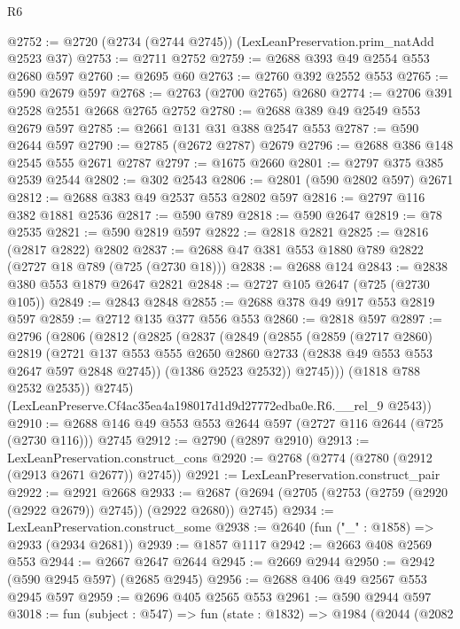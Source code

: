 \begin{lexlean}{R6}
\begin{coremodule}
@2752 := @2720 (@2734 (@2744 @2745)) (LexLeanPreservation.prim_natAdd @2523 @37)
@2753 := @2711 @2752
@2759 := @2688 @393 @49 @2554 @553 @2680 @597
@2760 := @2695 @60
@2763 := @2760 @392 @2552 @553
@2765 := @590 @2679 @597
@2768 := @2763 (@2700 @2765) @2680
@2774 := @2706 @391 @2528 @2551 @2668 @2765 @2752
@2780 := @2688 @389 @49 @2549 @553 @2679 @597
@2785 := @2661 @131 @31 @388 @2547 @553
@2787 := @590 @2644 @597
@2790 := @2785 (@2672 @2787) @2679
@2796 := @2688 @386 @148 @2545 @555 @2671 @2787
@2797 := @1675 @2660
@2801 := @2797 @375 @385 @2539 @2544
@2802 := @302 @2543
@2806 := @2801 (@590 @2802 @597) @2671
@2812 := @2688 @383 @49 @2537 @553 @2802 @597
@2816 := @2797 @116 @382 @1881 @2536
@2817 := @590 @789
@2818 := @590 @2647
@2819 := @78 @2535
@2821 := @590 @2819 @597
@2822 := @2818 @2821
@2825 := @2816 (@2817 @2822) @2802
@2837 := @2688 @47 @381 @553 @1880 @789 @2822 (@2727 @18 @789 (@725 (@2730 @18)))
@2838 := @2688 @124
@2843 := @2838 @380 @553 @1879 @2647 @2821
@2848 := @2727 @105 @2647 (@725 (@2730 @105))
@2849 := @2843 @2848
@2855 := @2688 @378 @49 @917 @553 @2819 @597
@2859 := @2712 @135 @377 @556 @553
@2860 := @2818 @597
@2897 := @2796
    (@2806
      (@2812
        (@2825
          (@2837
            (@2849
              (@2855
                (@2859
                  (@2717 @2860)
                  @2819
                  (@2721
                    @137
                    @553
                    @555
                    @2650
                    @2860
                    @2733
                    (@2838 @49 @553 @553 @2647 @597 @2848 @2745))
                  (@1386 @2523 @2532))
                @2745)))
          (@1818 @788 @2532 @2535))
        @2745)
      (LexLeanPreserve.Cf4ac35ea4a198017d1d9d27772edba0e.R6.__rel_9 @2543))
@2910 := @2688 @146 @49 @553 @553 @2644 @597 (@2727 @116 @2644 (@725 (@2730 @116))) @2745
@2912 := @2790 (@2897 @2910)
@2913 := LexLeanPreservation.construct_cons
@2920 := @2768 (@2774 (@2780 (@2912 (@2913 @2671 @2677)) @2745))
@2921 := LexLeanPreservation.construct_pair
@2922 := @2921 @2668
@2933 := @2687 (@2694 (@2705 (@2753 (@2759 (@2920 (@2922 @2679)) @2745)) (@2922 @2680)) @2745)
@2934 := LexLeanPreservation.construct_some
@2938 := @2640 (fun ("_" : @1858) => @2933 (@2934 @2681))
@2939 := @1857 @1117
@2942 := @2663 @408 @2569 @553
@2944 := @2667 @2647 @2644
@2945 := @2669 @2944
@2950 := @2942 (@590 @2945 @597) (@2685 @2945)
@2956 := @2688 @406 @49 @2567 @553 @2945 @597
@2959 := @2696 @405 @2565 @553
@2961 := @590 @2944 @597
@3018 := fun (subject : @547) =>
  fun (state : @1832) =>
  @1984
    (@2044
      (@2082

\end{coremodule}
\end{lexlean}

